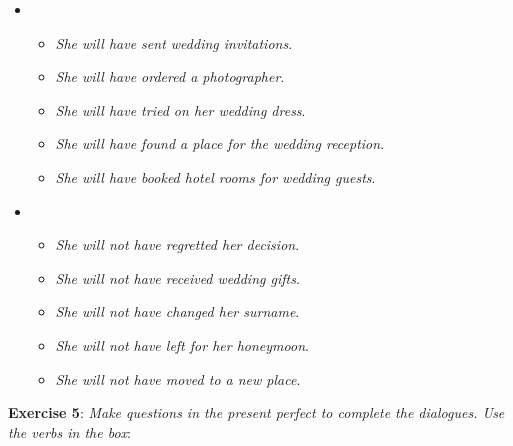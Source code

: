 \begin{itemize}

\item
\begin{itemize}
\item \textit{She will have sent wedding invitations}. 
\item \textit{She will have ordered a photographer}. 
\item \textit{She will have tried on her wedding dress}. 
\item \textit{She will have found a place for the wedding reception}.
\item \textit{She will have booked hotel rooms for wedding guests}.
\end{itemize}

\item
\begin{itemize}
\item \textit{She will not have regretted her decision}. 
\item \textit{She will not have received wedding gifts}. 
\item \textit{She will not have changed her surname}. 
\item \textit{She will not have left for her honeymoon}. 
\item \textit{She will not have moved to a new place}. 
\end{itemize}

\end{itemize}

\textbf{Exercise 5}: \textit{Make questions in the present perfect to complete the dialogues. Use the verbs in the box}:

